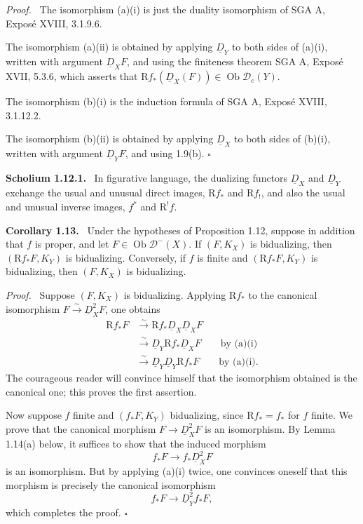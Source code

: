 \documentclass[11pt]{article}
\theoremstyle{plain}
\theoremstyle{definition}
\theoremstyle{remark}
\newenvironment{statement}[1]{\par\medskip\noindent\textbf{#1.}\ }{\par\medskip}
\newenvironment{prooftext}{\par\noindent\textit{Proof.}\ }{\par\medskip}
\newcommand{\D}{\mathcal D}\newcommand{\E}{\mathcal E}\newcommand{\F}{\mathcal F}
\DeclareMathOperator{\ob}{Ob}
\newcommand{\R}{\mathrm R}
\newcommand{\qedtext}{\hfill$\square$}
\begin{document}
\begin{prooftext}
The isomorphism (a)(i) is just the duality isomorphism of SGA A, Exposé XVIII, 3.1.9.6.

The isomorphism (a)(ii) is obtained by applying $\underline D_Y$ to both sides of (a)(i), written with argument $\underline D_XF$, and using the finiteness theorem SGA A, Exposé XVII, 5.3.6, which asserts that $\R f_*(\underline D_X(F))\in\ob\D_c(Y)$.

The isomorphism (b)(i) is the induction formula of SGA A, Exposé XVIII, 3.1.12.2.

The isomorphism (b)(ii) is obtained by applying $\underline D_X$ to both sides of (b)(i), written with argument $\underline D_YF$, and using 1.9(b). \qedtext
\end{prooftext}

\begin{statement}{Scholium 1.12.1}
In figurative language, the dualizing functors $\underline D_X$ and $\underline D_Y$ exchange the usual and unusual direct images, $\R f_*$ and $\R f_!$, and also the usual and unusual inverse images, $f^*$ and $\R^!f$.
\end{statement}

\begin{statement}{Corollary 1.13}
Under the hypotheses of Proposition 1.12, suppose in addition that $f$ is proper, and let $F\in\ob\D^-(X)$. If $(F,K_X)$ is bidualizing, then $(\R f_*F,K_Y)$ is bidualizing. Conversely, if $f$ is finite and $(\R f_*F,K_Y)$ is bidualizing, then $(F,K_X)$ is bidualizing.
\end{statement}

\begin{prooftext}
Suppose $(F,K_X)$ is bidualizing. Applying $\R f_*$ to the canonical isomorphism $F\xrightarrow{\sim}\underline D_X^2F$, one obtains
\begin{align*}
\R f_*F &\xrightarrow{\sim}\R f_*\underline D_X\underline D_XF \\
&\xrightarrow{\sim}\underline D_Y\R f_*\underline D_XF \qquad \text{by (a)(i)}\\
&\xrightarrow{\sim}\underline D_Y\underline D_Y\R f_*F \qquad \text{by (a)(i)}.
\end{align*}
The courageous reader will convince himself that the isomorphism obtained is the canonical one; this proves the first assertion.

Now suppose $f$ finite and $(f_*F,K_Y)$ bidualizing, since $\R f_*=f_*$ for $f$ finite. We prove that the canonical morphism $F\to\underline D_X^2F$ is an isomorphism. By Lemma 1.14(a) below, it suffices to show that the induced morphism
\[
   f_*F\longrightarrow f_*\underline D_X^2F
\]
is an isomorphism. But by applying (a)(i) twice, one convinces oneself that this morphism is precisely the canonical isomorphism
\[
   f_*F\longrightarrow \underline D_Y^2f_*F,
\]
which completes the proof. \qedtext
\end{prooftext}
\end{document}
